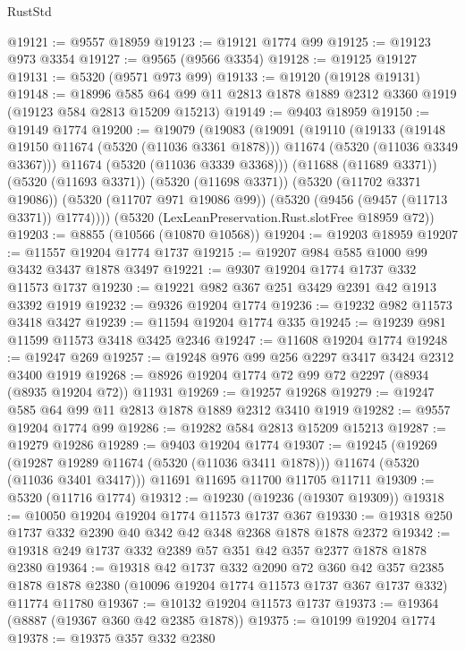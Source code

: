\begin{lexlean}{RustStd}
\begin{coremodule}
@19121 := @9557 @18959
@19123 := @19121 @1774 @99
@19125 := @19123 @973 @3354
@19127 := @9565 (@9566 @3354)
@19128 := @19125 @19127
@19131 := @5320 (@9571 @973 @99)
@19133 := @19120 (@19128 @19131)
@19148 := @18996
    @585
    @64
    @99
    @11
    @2813
    @1878
    @1889
    @2312
    @3360
    @1919
    (@19123 @584 @2813 @15209 @15213)
@19149 := @9403 @18959
@19150 := @19149 @1774
@19200 := @19079
    (@19083
      (@19091
        (@19110
          (@19133
            (@19148 @19150 @11674 (@5320 (@11036 @3361 @1878)))
            @11674
            (@5320 (@11036 @3349 @3367)))
          @11674
          (@5320 (@11036 @3339 @3368)))
        (@11688 (@11689 @3371))
        (@5320 (@11693 @3371))
        (@5320 (@11698 @3371))
        (@5320 (@11702 @3371 @19086))
        (@5320 (@11707 @971 @19086 @99))
        (@5320 (@9456 (@9457 (@11713 @3371)) @1774))))
    (@5320 (LexLeanPreservation.Rust.slotFree @18959 @72))
@19203 := @8855 (@10566 (@10870 @10568))
@19204 := @19203 @18959
@19207 := @11557 @19204 @1774 @1737
@19215 := @19207 @984 @585 @1000 @99 @3432 @3437 @1878 @3497
@19221 := @9307 @19204 @1774 @1737 @332 @11573 @1737
@19230 := @19221 @982 @367 @251 @3429 @2391 @42 @1913 @3392 @1919
@19232 := @9326 @19204 @1774
@19236 := @19232 @982 @11573 @3418 @3427
@19239 := @11594 @19204 @1774 @335
@19245 := @19239 @981 @11599 @11573 @3418 @3425 @2346
@19247 := @11608 @19204 @1774
@19248 := @19247 @269
@19257 := @19248 @976 @99 @256 @2297 @3417 @3424 @2312 @3400 @1919
@19268 := @8926 @19204 @1774 @72 @99 @72 @2297 (@8934 (@8935 @19204 @72)) @11931
@19269 := @19257 @19268
@19279 := @19247 @585 @64 @99 @11 @2813 @1878 @1889 @2312 @3410 @1919
@19282 := @9557 @19204 @1774 @99
@19286 := @19282 @584 @2813 @15209 @15213
@19287 := @19279 @19286
@19289 := @9403 @19204 @1774
@19307 := @19245
    (@19269 (@19287 @19289 @11674 (@5320 (@11036 @3411 @1878))) @11674 (@5320 (@11036 @3401 @3417)))
    @11691
    @11695
    @11700
    @11705
    @11711
@19309 := @5320 (@11716 @1774)
@19312 := @19230 (@19236 (@19307 @19309))
@19318 := @10050 @19204 @19204 @1774 @11573 @1737 @367
@19330 := @19318 @250 @1737 @332 @2390 @40 @342 @42 @348 @2368 @1878 @1878 @2372
@19342 := @19318 @249 @1737 @332 @2389 @57 @351 @42 @357 @2377 @1878 @1878 @2380
@19364 := @19318
    @42
    @1737
    @332
    @2090
    @72
    @360
    @42
    @357
    @2385
    @1878
    @1878
    @2380
    (@10096 @19204 @1774 @11573 @1737 @367 @1737 @332)
    @11774
    @11780
@19367 := @10132 @19204 @11573 @1737
@19373 := @19364 (@8887 (@19367 @360 @42 @2385 @1878))
@19375 := @10199 @19204 @1774
@19378 := @19375 @357 @332 @2380

\end{coremodule}
\end{lexlean}
